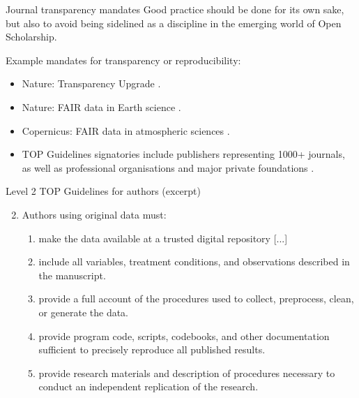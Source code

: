 \documentclass[aspectratio=169, 11pt]{beamer} %
\begin{document}
\begin{frame}{Journal transparency mandates}
  Good practice should be done for its own sake, but also to avoid being sidelined as a discipline in the emerging world of Open Scholarship. \par
  Example mandates for transparency or reproducibility:
    \begin{itemize}[label=\textbullet]
        \item Nature: Transparency Upgrade \cite{Nature2017-lq}.
        \item Nature: FAIR data in Earth science \cite{Nature2019-ng}.
        \item Copernicus: FAIR data in atmospheric sciences \cite{Van_Edig2018-bu}.
        \item TOP Guidelines signatories include publishers representing 1000+ journals, as well as professional organisations and major private foundations  \cite{Cos2019-mr}.
    \end{itemize}
\end{frame}


\begin{frame}{Level 2 TOP Guidelines for authors (excerpt)}
  
    \begin{enumerate}[label=\arabic*.]
        \setcounter{enumi}{1}
        
        \item Authors using original data must:
        \begin{enumerate}[label=\alph*.]
            \item make the data available at a trusted digital repository [...]
            \item include all variables, treatment conditions, and observations described in the manuscript.
            \item provide a full account of the procedures used to collect, preprocess, clean, or generate the data.
            \item provide program code, scripts, codebooks, and other documentation sufficient to precisely reproduce all published results.
            \item provide research materials and description of procedures necessary to conduct an independent replication of the research.
        \end{enumerate}
    \end{enumerate}
    \cite{Osf2014-pf}
\end{frame}
\end{document}
